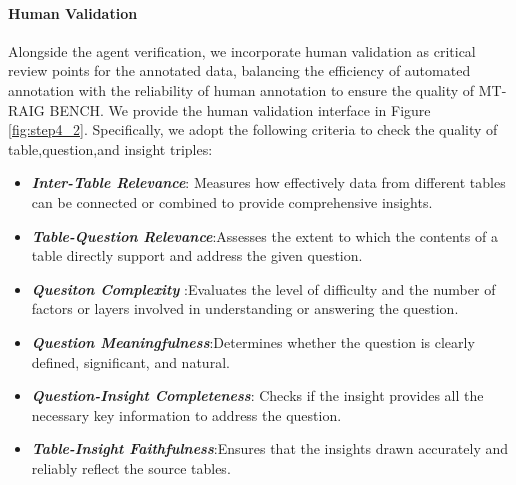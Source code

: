 \paragraph{Human Validation}
Alongside the agent verification, we incorporate human validation as critical review points for the annotated data, balancing the efficiency of automated annotation with the reliability of human annotation to ensure the quality of MT-RAIG BENCH.
We provide the human validation interface in Figure \ref{fig:step4_2}.
Specifically, we adopt the following criteria to check the quality of table,question,and insight triples:
\begin{itemize}[leftmargin=*,topsep=4pt,itemsep=4pt,parsep=0pt]
\item \textbf{\textit{Inter-Table Relevance}}: Measures how effectively data from different tables can be connected or combined to provide comprehensive insights.
    
 \item \textbf{\textit{Table-Question Relevance}}:Assesses the extent to which the contents of a table directly support and address the given question.
  \item \textbf{\textit{Quesiton Complexity }}:Evaluates the level of difficulty and the number of factors or layers involved in understanding or answering the question.
   \item \textbf{\textit{Question Meaningfulness}}:Determines whether the question is clearly defined, significant, and natural.
\item \textbf{\textit{Question-Insight Completeness}}: Checks if the insight provides all the necessary key information to address the question.
     \item \textbf{\textit{Table-Insight Faithfulness}}:Ensures that the insights drawn accurately and reliably reflect the source tables.
\end{itemize}
